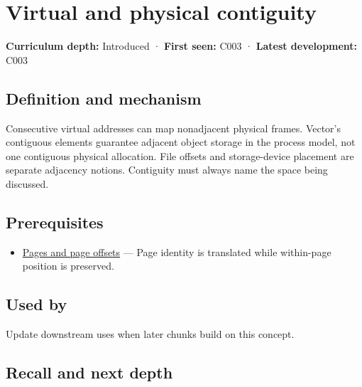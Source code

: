 \hypertarget{appendix-f897c1ddac8f}{}\label{referencestart:appendix-f897c1ddac8f}
\section{Virtual and physical contiguity}\label{appendix-f897c1ddac8f-virtual-and-physical-contiguity}

\textbf{Curriculum depth:} Introduced · \textbf{First seen:} C003 · \textbf{Latest development:} C003

\begin{allmightroledefinition}

\subsection{Definition and mechanism}\label{appendix-f897c1ddac8f-definition-and-mechanism}

Consecutive virtual addresses can map nonadjacent physical frames. Vector's contiguous elements guarantee adjacent object storage in the process model, not one contiguous physical allocation. File offsets and storage-device placement are separate adjacency notions. Contiguity must always name the space being discussed.

\end{allmightroledefinition}

\subsection{Prerequisites}\label{appendix-f897c1ddac8f-prerequisites}

\begin{itemize}
\tightlist
\item
  \hyperref[appendix-0c67cd5bf30a]{Pages and page offsets} --- Page identity is translated while within-page position is preserved.
\end{itemize}

\subsection{Used by}\label{appendix-f897c1ddac8f-used-by}

Update downstream uses when later chunks build on this concept.

\subsection{Recall and next depth}\label{appendix-f897c1ddac8f-recall-and-next-depth}

